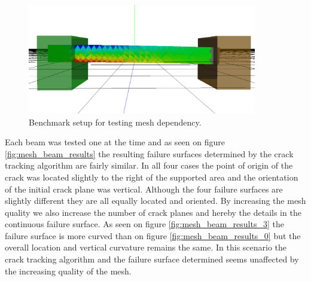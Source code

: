 \begin{figure}
    \centering
    \includegraphics[width=100mm]{./images/results_mesh_setup.png}
    \caption{Benchmark setup for testing mesh dependency.}
    \label{fig:mesh_beam_setup}
\end{figure}

Each beam was tested one at the time and as seen on figure \vref{fig:mesh_beam_results}
the resulting failure surfaces determined by the crack tracking
algorithm are fairly similar. In all four cases the point of origin of
the crack was located slightly to the right of the supported area and the
orientation of the initial crack plane was vertical. Although the four
failure surfaces are slightly different they are all equally located
and oriented. By increasing the mesh quality we also increase the
number of crack planes and hereby the details in the continuous failure
surface. As seen on figure \vref{fig:mesh_beam_results_3} the failure
surface is more curved than on figure \vref{fig:mesh_beam_results_0}
but the overall location and vertical curvature remains the same.
In this scenario the crack tracking algorithm and the failure surface
determined seems unaffected by the increasing quality of the mesh.
 
